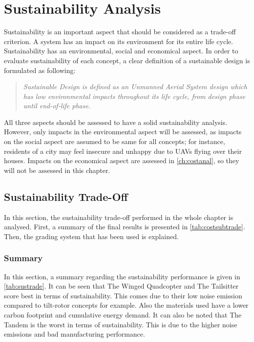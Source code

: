 \chapter{Sustainability Analysis}
\label{ch:sustain}
\setlength{\parindent}{15pt}

Sustainability is an important aspect that should be considered as a trade-off criterion. A system has an impact on its environment for its entire life cycle. Sustainability has an environmental, social and economical aspect. In order to evaluate sustainability of each concept, a clear definition of a sustainable design is formulated as following:


\begin{quote}
	\begin{itshape}
	\textit{Sustainable Design is defined as an Unmanned Aerial System design which has low environmental impacts throughout its life cycle, from design phase until end-of-life phase.}
	\end{itshape}
\end{quote}


All three aspects should be assessed to have a solid sustainability analysis. However, only impacts in the environmental aspect will be assessed, as impacts on the social aspect are assumed to be same for all concepts; for instance, residents of a city may feel insecure  and unhappy due to UAVs flying over their houses. Impacts on the economical aspect are assessed in \autoref{ch:costanal}, so they will not be assessed in this chapter. 

\section{Sustainability Trade-Off}

In this section, the sustainability trade-off performed in the whole chapter is analysed. First, a summary of the final results is presented in \autoref{tab:costsubtrade}. Then, the grading system that has been used is explained.  

\subsection{Summary}

In this section, a summary regarding the sustainability performance is given in \autoref{tab:sustrade}. It can be seen that The Winged Quadcopter and The Tailsitter score best in terms of sustainability. This comes due to their low noise emission compared to tilt-rotor concepts for example. Also the materials used have a lower carbon footprint and cumulative energy demand. 
It can also be noted that The Tandem is the worst in terms of sustainability. This is due to the higher noise emissions and bad manufacturing performance.

